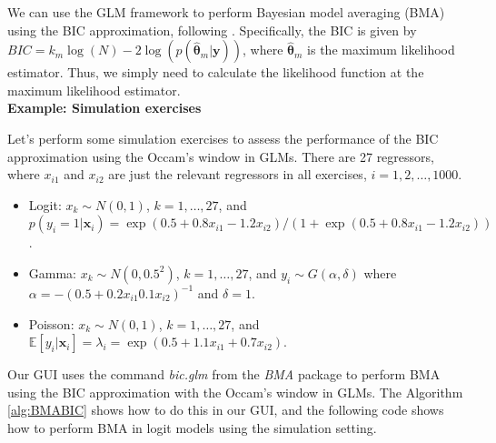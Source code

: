 We can use the GLM framework to perform Bayesian model averaging (BMA) using the BIC approximation, following \cite{Raftery1995}. Specifically, the BIC is given by $BIC = k_m \log(N) - 2 \log(p(\hat{\bm{\theta}}_m | \bm{y}))$, where $\hat{\bm{\theta}}_m$ is the maximum likelihood estimator. Thus, we simply need to calculate the likelihood function at the maximum likelihood estimator.\\

\textbf{Example: Simulation exercises}

Let's perform some simulation exercises to assess the performance of the BIC approximation using the Occam's window in GLMs. There are 27 regressors, where $x_{i1}$ and $x_{i2}$ are just the relevant regressors in all exercises, $i=1,2,\dots,1000$.
\begin{itemize}
	\item Logit: $x_k\sim N(0, 1)$, $k =1,\dots,27$, and $p(y_i=1|\bm{x}_i)=\exp(0.5+0.8x_{i1}-1.2x_{i2})/(1+\exp(0.5+0.8x_{i1}-1.2x_{i2}))$.
	
	\item Gamma: $x_k\sim N(0, 0.5^2)$, $k =1,\dots,27$, and $y_i\sim G(\alpha,\delta)$ where $\alpha=-(0.5+0.2x_{i1}0.1x_{i2})^{-1}$ and $\delta=1$.
	
	\item Poisson: $x_k\sim N(0, 1)$, $k =1,\dots,27$, and $\mathbb{E}[y_i|\bm{x}_i]=\lambda_i=\exp(0.5+1.1x_{i1}+0.7x_{i2})$.   
\end{itemize}

Our GUI uses the command \textit{bic.glm} from the \textit{BMA} package to perform BMA using the BIC approximation with the Occam's window in GLMs. The Algorithm \ref{alg:BMABIC} shows how to do this in our GUI, and the following code shows how to perform BMA in logit models using the simulation setting.

